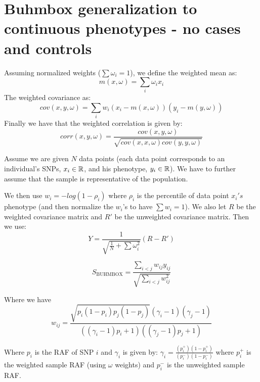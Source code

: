 \documentclass[11pt]{hw-template}
\begin{document}
\maketitle

\section*{Buhmbox generalization to continuous phenotypes - no cases and controls}

\noindent Assuming normalized weights ($\sum \omega_i = 1$), we define the weighted mean as:
$$m(x, \omega) = \sum_i \omega_i x_i$$
The weighted covariance as:
$$cov(x, y, \omega) = \sum_i w_i(x_i - m(x, \omega))(y_i - m(y, \omega))$$
Finally we have that the weighted correlation is given by:
$$corr(x, y, \omega) = \frac{cov(x, y, \omega)}{\sqrt{cov(x, x, \omega)cov(y, y, \omega)}}$$

Assume we are given $N$ data points (each data point corresponds to an individual's SNPs, $x_i \in \operatorname{\mathbb{R}}$, and his phenotype, $y_i \in \operatorname{\mathbb{R}}$). We have to further assume that the sample is 
representative of the population.

We then use $w_i = -log(1-\rho_i)$ where $\rho_i$ is the percentile of data point $x_i's$ phenotype (and then normalize the $w_i$'s to have $\sum w_i = 1$). We also let $R$ be the weighted
covariance matrix and $R'$ be the unweighted covariance matrix.
Then we use:
$$ Y = \frac{1}{\sqrt{\frac{1}{N} + \sum \omega_i^2}} (R-R')$$

$$S_\text{BUHMBOX} = \frac{\sum_{i < j} w_{ij}y_{ij}}{\sqrt{\sum_{i<j}w_{ij}^2}}$$

Where we have
$$w_{ij} = \frac{\sqrt{p_i(1-p_i)p_j(1-p_j)}(\gamma_i - 1)(\gamma_j - 1)}{((\gamma_i-1)p_i + 1)((\gamma_j - 1)p_j + 1)}$$

Where $p_i$ is the RAF of SNP $i$ and $\gamma_i$ is given by:
$\gamma_i = \frac{(p_i^+)(1-p_i^+)}{(p_i^-)(1-p_i^-)}$ where $p_i^+$ is the weighted sample RAF (using $\omega$ weights) and $p_i^-$ is the unweighted sample RAF.
\end{document}
